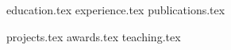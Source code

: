 \documentclass[letterpaper,11pt]{article}
\begin{document}
\header{\nameFull}{
    \emailLink{\email} \\
    \websiteLink{\website} \\ 
    \githubLink{\github} \\
    \linkedinLink{\linkedin}
}

\resumeDescription

{education.tex}
{experience.tex}
{publications.tex}

{projects.tex}
{awards.tex}
{teaching.tex}


\end{document}
